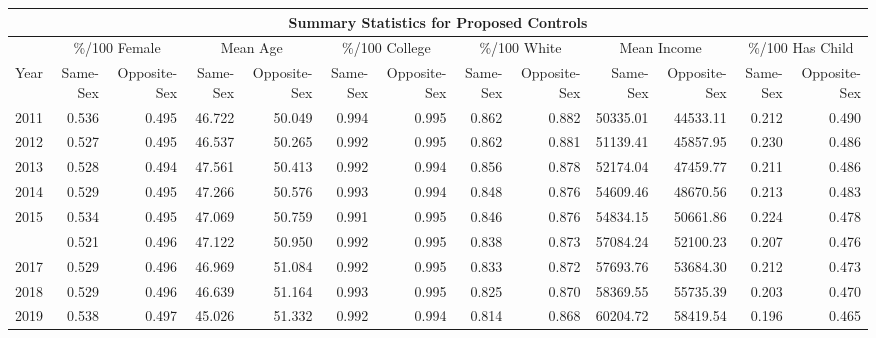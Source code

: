 
\centering
\begin{tabular}[t]{rrrrrrrrrrrrr}
\toprule
\multicolumn{13}{c}{Summary Statistics for Proposed Controls} \\ \hline %
\multicolumn{1}{c}{ } & \multicolumn{2}{c}{\%/100 Female} & \multicolumn{2}{c}{Mean Age} & \multicolumn{2}{c}{\%/100 College} & \multicolumn{2}{c}{\%/100 White} & \multicolumn{2}{c}{Mean Income} & \multicolumn{2}{c}{\%/100 Has Child} \\
\cmidrule(l{3pt}r{3pt}){2-3} \cmidrule(l{3pt}r{3pt}){4-5} \cmidrule(l{3pt}r{3pt}){6-7} \cmidrule(l{3pt}r{3pt}){8-9} \cmidrule(l{3pt}r{3pt}){10-11} \cmidrule(l{3pt}r{3pt}){12-13}
Year & Same-Sex & Opposite-Sex & Same-Sex & Opposite-Sex & Same-Sex & Opposite-Sex & Same-Sex & Opposite-Sex & Same-Sex & Opposite-Sex & Same-Sex & Opposite-Sex\\
\midrule
2011 & 0.536 & 0.495 & 46.722 & 50.049 & 0.994 & 0.995 & 0.862 & 0.882 & 50335.01 & 44533.11 & 0.212 & 0.490\\
2012 & 0.527 & 0.495 & 46.537 & 50.265 & 0.992 & 0.995 & 0.862 & 0.881 & 51139.41 & 45857.95 & 0.230 & 0.486\\
2013 & 0.528 & 0.494 & 47.561 & 50.413 & 0.992 & 0.994 & 0.856 & 0.878 & 52174.04 & 47459.77 & 0.211 & 0.486\\
2014 & 0.529 & 0.495 & 47.266 & 50.576 & 0.993 & 0.994 & 0.848 & 0.876 & 54609.46 & 48670.56 & 0.213 & 0.483\\
2015 & 0.534 & 0.495 & 47.069 & 50.759 & 0.991 & 0.995 & 0.846 & 0.876 & 54834.15 & 50661.86 & 0.224 & 0.478\\
\addlinespace
2016 & 0.521 & 0.496 & 47.122 & 50.950 & 0.992 & 0.995 & 0.838 & 0.873 & 57084.24 & 52100.23 & 0.207 & 0.476\\
2017 & 0.529 & 0.496 & 46.969 & 51.084 & 0.992 & 0.995 & 0.833 & 0.872 & 57693.76 & 53684.30 & 0.212 & 0.473\\
2018 & 0.529 & 0.496 & 46.639 & 51.164 & 0.993 & 0.995 & 0.825 & 0.870 & 58369.55 & 55735.39 & 0.203 & 0.470\\
2019 & 0.538 & 0.497 & 45.026 & 51.332 & 0.992 & 0.994 & 0.814 & 0.868 & 60204.72 & 58419.54 & 0.196 & 0.465\\
\bottomrule
\end{tabular}
